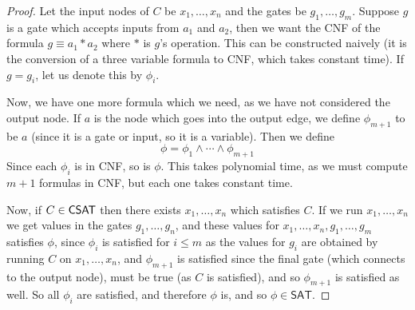 \documentclass[10pt]{article}
\def\sat{\textsf{SAT}}
\begin{document}
\begin{proof}


    Let the input nodes of $C$ be $x_1,\dots,x_n$ and the gates be $g_1,\dots,g_m$.
    Suppose $g$ is a gate which accepts inputs from $a_1$ and $a_2$, then we want the CNF of the formula $g\equiv a_1*a_2$ where $*$ is $g$'s operation.
    This can be constructed naively (it is the conversion of a three variable formula to CNF, which takes constant time).
    If $g=g_i$, let us denote this by $\phi_i$.

    Now, we have one more formula which we need, as we have not considered the output node.
    If $a$ is the node which goes into the output edge, we define $\phi_{m+1}$ to be $a$ (since it is a gate or input, so it is a variable). 
    Then we define
    \[ \phi = \phi_1\land\cdots\land\phi_{m+1} \]
    Since each $\phi_i$ is in CNF, so is $\phi$.
    This takes polynomial time, as we must compute $m+1$ formulas in CNF, but each one takes constant time.

    Now, if $C\in\mathsf{CSAT}$ then there exists $x_1,\dots,x_n$ which satisfies $C$.
    If we run $x_1,\dots,x_n$ we get values in the gates $g_1,\dots,g_n$, and these values for $x_1,\dots,x_n,g_1,\dots,g_m$ satisfies $\phi$, since $\phi_i$ is satisfied for $i\leq m$ as the values for
    $g_i$ are obtained by running $C$ on $x_1,\dots,x_n$, and $\phi_{m+1}$ is satisfied since the final gate (which connects to the output node), must be true (as $C$ is satisfied), and so $\phi_{m+1}$ is
    satisfied as well.
    So all $\phi_i$ are satisfied, and therefore $\phi$ is, and so $\phi\in\sat$.


\end{proof}
\end{document}
